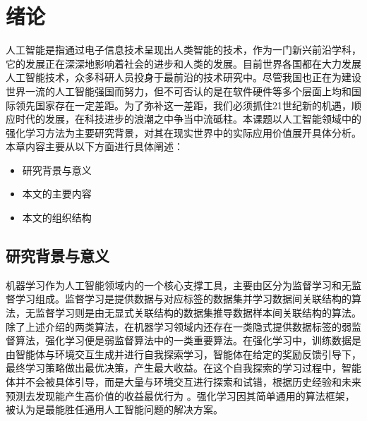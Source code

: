 
\chapter{绪论}\label{chap:intro}

人工智能是指通过电子信息技术呈现出人类智能的技术，作为一门新兴前沿学科，它的发展正在深深地影响着社会的进步和人类的发展。目前世界各国都在大力发展人工智能技术，众多科研人员投身于最前沿的技术研究中。尽管我国也正在为建设世界一流的人工智能强国而努力，但不可否认的是在软件硬件等多个层面上均和国际领先国家存在一定差距。为了弥补这一差距，我们必须抓住21世纪新的机遇，顺应时代的发展，在科技进步的浪潮之中争当中流砥柱。本课题以人工智能领域中的强化学习方法为主要研究背景，对其在现实世界中的实际应用价值展开具体分析。本章内容主要从以下方面进行具体阐述：

\begin{itemize}
    \item 研究背景与意义
    \item 本文的主要内容
    \item 本文的组织结构
\end{itemize}

\section{研究背景与意义}

机器学习作为人工智能领域内的一个核心支撑工具，主要由区分为监督学习和无监督学习组成\cite{sathya2013comparison,goodfellow2016deep}。监督学习是提供数据与对应标签的数据集并学习数据间关联结构的算法，无监督学习则是由无显式关联结构的数据集推导数据样本间关联结构的算法\cite{bishop2006pattern}。除了上述介绍的两类算法，在机器学习领域内还存在一类隐式提供数据标签的弱监督算法\cite{zhou2018brief}，强化学习便是弱监督算法中的一类重要算法。在强化学习中，训练数据是由智能体与环境交互生成并进行自我探索学习，智能体在给定的奖励反馈引导下，最终学习策略做出最优决策，产生最大收益\cite{tan1993multi}。在这个自我探索的学习过程中，智能体并不会被具体引导，而是大量与环境交互进行探索和试错，根据历史经验和未来预测去发现能产生高价值的收益最优行为 \cite{kaelbling1996reinforcement,sutton2018reinforcement}。强化学习因其简单通用的算法框架，被认为是最能胜任通用人工智能问题的解决方案\cite{shoham2003multi}。 

